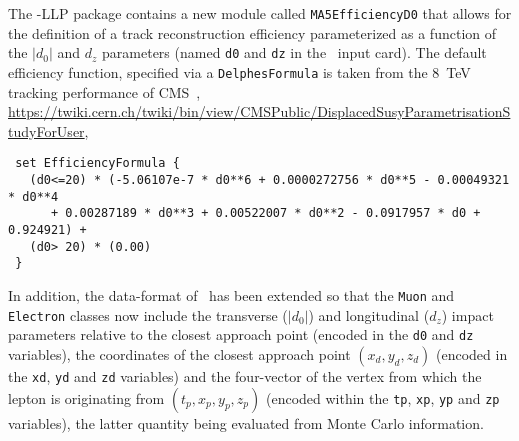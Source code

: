 The \DEL-LLP package contains a new module called \verb+MA5EfficiencyD0+ that
allows for the definition of a track reconstruction efficiency parameterized as a function of the $|d_0|$ and $d_z$ parameters (named \verb+d0+ and \verb+dz+ in the \DEL\ input
card). The default efficiency function, specified via a \verb+DelphesFormula+ is taken from the
8~TeV tracking performance of CMS~\cite{Khachatryan:2014mea},\\ 
\noindent \url{https://twiki.cern.ch/twiki/bin/view/CMSPublic/DisplacedSusyParametrisationStudyForUser},\\
\begin{verbatim}
 set EfficiencyFormula {
   (d0<=20) * (-5.06107e-7 * d0**6 + 0.0000272756 * d0**5 - 0.00049321 * d0**4
      + 0.00287189 * d0**3 + 0.00522007 * d0**2 - 0.0917957 * d0 +  0.924921) +
   (d0> 20) * (0.00)
 }
\end{verbatim}
In addition, the data-format of \DEL\ has been extended so that the \verb+Muon+ and
\verb+Electron+ classes now include the transverse ($|d_0|$) and longitudinal ($d_z$) impact parameters relative to the closest approach point (encoded
in the \verb+d0+ and \verb+dz+ variables), the coordinates of the closest
approach point $(x_d, y_d, z_d)$ (encoded in the \verb+xd+, \verb+yd+ and
\verb+zd+ variables) and the four-vector of the vertex from which the lepton is
originating from $(t_p, x_p, y_p, z_p)$ (encoded within the \verb+tp+,
\verb+xp+, \verb+yp+ and \verb+zp+ variables), the latter quantity being
evaluated from Monte Carlo information.


